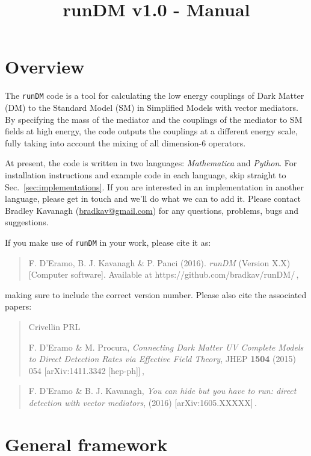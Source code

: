 \documentclass[notitlepage,12pt]{article}
\newcommand{\runDM}{\texttt{runDM}\xspace}
\begin{document}
\title{runDM v1.0 - Manual}
\maketitle


\section{Overview}

The \runDM code is a tool for calculating the low energy couplings of Dark Matter (DM) to the Standard Model (SM) in Simplified Models with vector mediators. By specifying the mass of the mediator and the couplings of the mediator to SM fields at high energy, the code outputs the couplings at a different energy scale, fully taking into account the mixing of all dimension-6 operators.

At present, the code is written in two languages: \textit{Mathematica} and \textit{Python}. For installation instructions and example code in each language, skip straight to Sec.~\ref{sec:implementations}. If you are interested in an implementation in another language, please get in touch and we'll do what we can to add it. Please contact Bradley Kavanagh (\href{mailto:bradkav@gmail.com?subject=runDM v.10}{bradkav@gmail.com}) for any questions, problems, bugs and suggestions.

If you make use of \runDM in your work, please cite it as:

\begin{quote}
F. D'Eramo, B. J. Kavanagh \& P. Panci (2016). \textit{runDM} (Version X.X) [Computer software]. Available at https://github.com/bradkav/runDM/\,,
\end{quote}
making sure to include the correct version number. Please also cite the associated papers:

\begin{quote}
Crivellin PRL

F. D'Eramo \& M. Procura, \textit{Connecting Dark Matter UV Complete Models to Direct Detection Rates via Effective Field Theory}, JHEP {\bf 1504} (2015) 054 [arXiv:1411.3342 [hep-ph]]\,,
\end{quote}

\begin{quote}
F. D'Eramo \& B. J. Kavanagh, \textit{You can hide but you have to run: direct detection with vector mediators}, (2016) [arXiv:1605.XXXXX]\,.
\end{quote}


\section{General framework}
\end{document}
